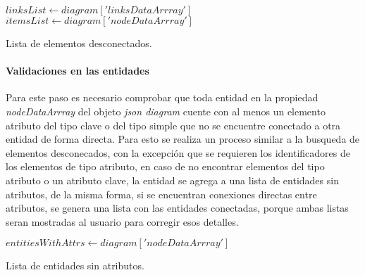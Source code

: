 \begin{algorithm}[H]

  $linksList \gets diagram['linksDataArrray']$\\
  $itemsList \gets diagram['nodeDataArrray']$\\
  
  \caption{Lista de elementos desconectados.}
\end{algorithm}


\paragraph*{Validaciones en las entidades}

Para este paso es necesario comprobar que toda entidad en la propiedad \textit{nodeDataArrray} del objeto \textit{json diagram} cuente con al menos un elemento atributo del tipo clave o del tipo simple que no se encuentre conectado a otra entidad de forma directa. Para esto se realiza un proceso similar a la busqueda de elementos desconecados, con la excepción que se requieren los identificadores de los elementos de tipo atributo, en caso de no encontrar elementos del tipo atributo o un atributo clave, la entidad se agrega a una lista de entidades sin atributos, de la misma forma, si se encuentran conexiones directas entre atributos, se genera una lista con las entidades conectadas, porque ambas listas seran mostradas al usuario para corregir esos detalles.

\begin{algorithm}[H]

  $entitiesWithAttrs \gets diagram['nodeDataArrray']$\\
  
  \caption{Lista de entidades sin atributos.}
\end{algorithm}

